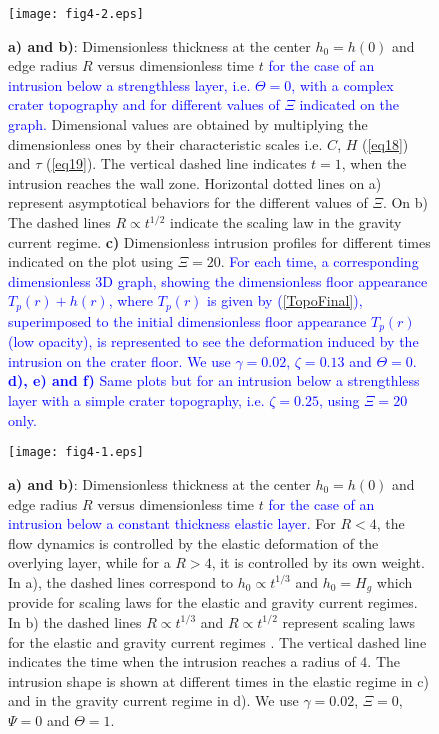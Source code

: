 \begin{article}
\begin{figure}[pb]
\graphicspath{{/Users/thorey/Documents/These/Submission/Article/FFC_JGR_2013/Paper_APRES_2nd_REVIEW/}}
  \centering
  \noindent\texttt{[image: fig4-2.eps]}
  \caption{\textbf{a) and  b)}: Dimensionless thickness at  the center
    $h_0=h(0)$  and  edge radius  $R$  versus  dimensionless time  $t$
    \textcolor{blue}{for the case of an intrusion below a strengthless
      layer, i.e. $\Theta=0$, with a complex crater topography and for
      different values  of $\Xi$ indicated on  the graph.} Dimensional
    values are obtained by multiplying the dimensionless ones by their
    characteristic  scales  i.e.  $C$,  $H$  (\ref{eq18})  and  $\tau$
    (\ref{eq19}). The  vertical dashed line indicates  $t=1$, when the
    intrusion reaches  the wall  zone. Horizontal  dotted lines  on a)
    represent  asymptotical  behaviors  for the  different  values  of
    $\Xi$.  On b)  The dashed  lines $R\propto  t^{1/2}$ indicate  the
    scaling   law  in   the   gravity   current  regime.   \textbf{c)}
    Dimensionless intrusion profiles for  different times indicated on
    the  plot  using  $\Xi=20$.   \textcolor{blue}{For  each  time,  a
      corresponding dimensionless 3D  graph, showing the dimensionless
      floor  appearance  $T_p(r)+h(r)$,  where $T_p(r)$  is  given  by
      (\ref{TopoFinal}),  superimposed  to the  initial  dimensionless
      floor appearance  $T_p(r)$ (low opacity), is  represented to see
      the deformation induced by the intrusion on the crater floor. We
      use $\gamma=0.02$,  $\zeta=0.13$ and $\Theta=0$.  \textbf{d), e)
        and f)} Same  plots but for an intrusion  below a strengthless
      layer with a simple  crater topography, i.e. $\zeta=0.25$, using
      $\Xi=20$ only. }}
  \label{fig4-2}
\end{figure}


\begin{figure}[pb]
\graphicspath{{/Users/thorey/Documents/These/Submission/Article/FFC_JGR_2013/Paper_APRES_2nd_REVIEW/}}
  \centering
  \noindent\texttt{[image: fig4-1.eps]}
  \caption{\textbf{a) and  b)}: Dimensionless thickness at  the center
    $h_0=h(0)$  and  edge radius  $R$  versus  dimensionless time  $t$
    \textcolor{blue}{for  the case  of an  intrusion below  a constant
      thickness  elastic  layer.}  For  $R<4$, the  flow  dynamics  is
    controlled  by the  elastic  deformation of  the overlying  layer,
    while for a $R>4$, it is controlled  by its own weight. In a), the
    dashed   lines   correspond    to   $h_{0}\propto   t^{1/3}$   and
    $h_{0} = H_g$  which provide for scaling laws for  the elastic and
    gravity current regimes. In b) the dashed lines $R\propto t^{1/3}$
    and $R\propto t^{1/2}$ represent scaling  laws for the elastic and
    gravity current  regimes \citep{Michaut2011}. The  vertical dashed
    line indicates  the time  when the intrusion  reaches a  radius of
    $4$.  The intrusion  shape  is  shown at  different  times in  the
    elastic regime in  c) and in the gravity current  regime in d). We
    use $\gamma=0.02$, $\Xi=0$, $\Psi=0$ and $\Theta=1$. }
  \label{fig4-1}
\end{figure}


\end{article}
